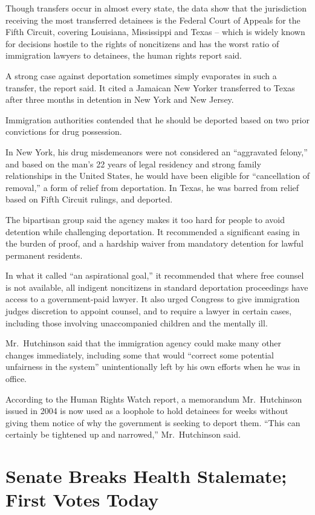 ﻿\documentclass[12pt]{article}
\begin{document}
Though transfers occur in almost every state, the data show that the jurisdiction receiving the most
transferred detainees is the Federal Court of Appeals for the Fifth Circuit, covering Louisiana,
Mississippi and Texas -- which is widely known for decisions hostile to the rights of noncitizens
and has the worst ratio of immigration lawyers to detainees, the human rights report said.

A strong case against deportation sometimes simply evaporates in such a transfer, the report said.
It cited a Jamaican New Yorker transferred to Texas after three months in detention in New York and
New Jersey.

Immigration authorities contended that he should be deported based on two prior convictions for drug
possession.

In New York, his drug misdemeanors were not considered an ``aggravated felony,'' and based on the
man's 22 years of legal residency and strong family relationships in the United States, he would
have been eligible for ``cancellation of removal,'' a form of relief from deportation. In Texas, he
was barred from relief based on Fifth Circuit rulings, and deported.

The bipartisan group said the agency makes it too hard for people to avoid detention while
challenging deportation. It recommended a significant easing in the burden of proof, and a hardship
waiver from mandatory detention for lawful permanent residents.

In what it called ``an aspirational goal,'' it recommended that where free counsel is not available,
all indigent noncitizens in standard deportation proceedings have access to a government-paid
lawyer. It also urged Congress to give immigration judges discretion to appoint counsel, and to
require a lawyer in certain cases, including those involving unaccompanied children and the mentally
ill.

Mr.~Hutchinson said that the immigration agency could make many other changes immediately, including
some that would ``correct some potential unfairness in the system'' unintentionally left by his own
efforts when he was in office.

According to the Human Rights Watch report, a memorandum Mr.~Hutchinson issued in 2004 is now used
as a loophole to hold detainees for weeks without giving them notice of why the government is
seeking to deport them. ``This can certainly be tightened up and narrowed,'' Mr.~Hutchinson said.

\section{Senate Breaks Health Stalemate; First Votes Today}
\end{document}
